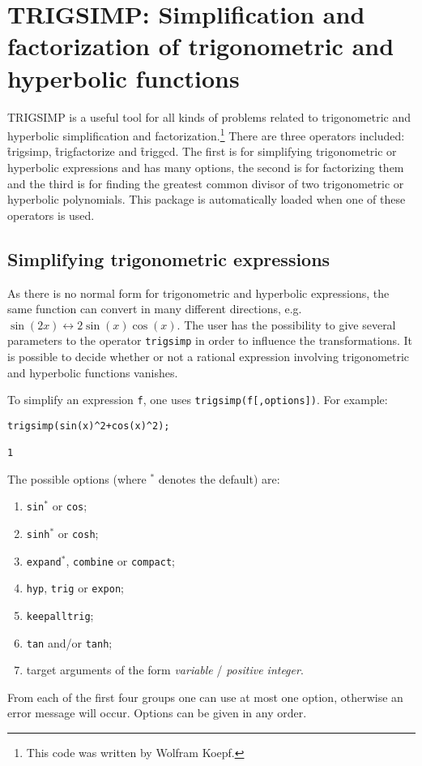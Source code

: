 \section[TRIGSIMP]{TRIGSIMP: Simplification and factorization of trigonometric
and hyperbolic functions}
\label{sec:TRIGSIMP}

TRIGSIMP is a useful tool for all kinds of
problems related to trigonometric and hyperbolic simplification and
factorization.\footnote{This code was written by Wolfram Koepf.}  There are three operators included:
\f{trigsimp}, \f{trigfactorize} and \f{triggcd}.  The first is for simplifying
trigonometric or hyperbolic expressions and has many options, the
second is for factorizing them and the third is for finding the
greatest common divisor of two trigonometric or hyperbolic
polynomials.  This package is automatically loaded when one of these
operators is used.


\subsection{Simplifying trigonometric expressions}
\hypertarget{operator:TRIGSIMP}{}
As there is no normal form for trigonometric and hyperbolic
expressions, the same function can convert in many different
directions, e.g.\ $\sin(2x) \leftrightarrow 2\sin(x)\cos(x)$.  The
user has the possibility to give several parameters to the operator
\texttt{trigsimp} in order to influence the transformations.  It is
possible to decide whether or not a rational expression involving
trigonometric and hyperbolic functions vanishes.

To simplify an expression \texttt{f}, one uses
\texttt{trigsimp(f[,options])}.  For example:
\begin{verbatim}
trigsimp(sin(x)^2+cos(x)^2);

1
\end{verbatim}
The possible options (where $^*$ denotes the default) are:
\begin{enumerate}
\item \texttt{sin}$^*$ or \texttt{cos};
\item \texttt{sinh}$^*$ or \texttt{cosh};
\item \texttt{expand}$^*$, \texttt{combine} or \texttt{compact};
\item \texttt{hyp}, \texttt{trig} or \texttt{expon};
\item \texttt{keepalltrig};
\item \texttt{tan} and/or \texttt{tanh};
\item target arguments of the form \textit{variable} /
\textit{positive integer}.
\end{enumerate}
From each of the first four groups one can use at most one option,
otherwise an error message will occur.  Options can be given in any
order.


